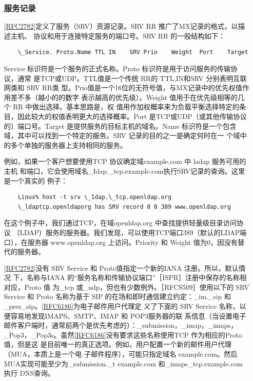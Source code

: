 \subsubsection{服务记录}

\href{https://www.rfc-editor.org/rfc/rfc2782}{[RFC2782]}定义了服务（SRV）资源记录。SRV
RR 推广了MX记录的格式，以描述主机、
协议和用于连接特定服务的端口号。SRV RR 的一般结构如下：

\begin{verbatim}
    \_Service. Proto.Name TTL IN    SRV Prio    Weight  Port    Target
\end{verbatim}

Service 标识符是一个服务的正式名称。Proto 标识符是用于访问服务的传输协议，通常
是TCP或UDP。TTL值是一个传统 RR的 TTL,IN和SRV 分别表明互联网类和 SRV RR类
型。Prio值是一个16位的无符号值，与MX记录中的优先权值作用差不多（越小的的数字
表示越高的优先级）。Weight 值用于在优先级相等的几个 RR 中做出选择。基本思路是，权
值用作加权概率来为负载平衡选择特定的条目，因此较大的权值表明更大的选择概率。Port
是TCP或UDP（或其他传输协议的）端口号。Target 是提供服务的目标主机的域名。Name
标识符是一个包含域，其中可以找到一个特定的服务。SRV 记录的目的之一是确定何时在一
个域中的多个单独的服务器上支持相同的服务。

例如，如果一个客户想要使用TCP 协议确定域example.com 中 ladap 服务可用的主机
和端口，它会使用域名\_Idap.\_tcp.example.com执行SRV记录的查询。这里是一个真实的
例子：

\begin{verbatim}
    Linux% host -t srv \_1dap.\_tcp.openldap.org
    \_ldaptcp.openldaporg has SRV record 0 0 389 www.openldap.org
\end{verbatim}

在这个例子中，我们通过TCP，在域openldap.org 中查找提供轻量级目录访问协议
（LDAP）服务的服务器。我们发现，可以使用TCP端口389（默认的LDAP端口），在服务器
www.openldap.org 上访问。Priority 和 Weight 值为0，因没有替代的服务器。

\href{https://www.rfc-editor.org/rfc/rfc2782}{[RFC2782]}没有 SRV
Service 和 Proto值指定一个新的IANA 注册。所以，默认情况
下，名称与IANA 的“服务名称和传输协议端口”［ISPR］注册中保存的名称相对应，Proto 值
为\_tcp 或\_udp，但也有少数例外。［RFCS509］使用以下的 SRV Service 和 Proto 名称为基于
SIP 的在场和即时通信建立约定：\_im.\_sip
和\_pres\_sip。\href{https://www.rfc-editor.org/rfc/rfc6186}{[RFC6186]}为电子邮件用户代理定
义了下面的 SRV Service 名称，以便容易地发现IMAPS、SMTP、IMAP 和 POP3服务器的联
系信息（当设置电子邮件客户端时，通常前两个是优先考虑的）：\_submission，\_imap，\_imaps，
\_Pop3，\_Pop3s。虽然\href{https://www.rfc-editor.org/rfc/rfc6186}{[RFC6186]}没有要求这些名称使用TCP
作为相应的Proto 值，但是这
是目前唯一的真正选项。例如，用户配置一个新的邮件用户代理（MUA，本质上是一个电
子邮件程序），可能只指定域名 example.com。然后MUA实现可能至少为\_submission.\_t
example.com 和\_imaps\_tcp.example.com 执行 DNS查询。

